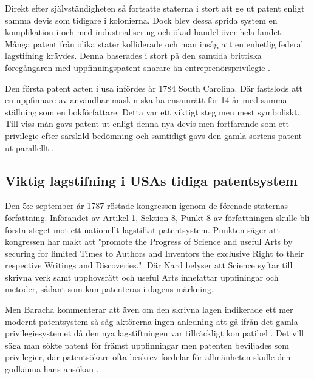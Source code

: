 Direkt efter självständigheten så fortsatte staterna i stort att ge ut patent enligt samma devis som tidigare i
kolonierna. Dock blev dessa sprida system en komplikation i och med industrialisering och ökad handel över
hela landet. Många patent från olika stater kolliderade och man insåg att en enhetlig federal
lagstifning krävdes. Denna baserades i stort på den samtida brittiska föregångaren med uppfinningspatent
snarare än entreprenörsprivilegie \cite{nard}.

Den första patent acten i usa infördes år 1784 South Carolina. Där fastslods att en uppfinnare av
användbar maskin ska ha ensamrätt för 14 år med samma ställning som en bokförfattare\cite{bracha}. Detta var ett viktigt steg men mest symboliskt. Till viss mån gavs patent ut enligt
denna nya devis men fortfarande som ett privilegie efter särskild bedömning och samtidigt gavs den gamla
sortens patent ut parallellt \cite{bracha}.



\subsection{Viktig lagstifning i USAs tidiga patentsystem}

Den 5:e september år 1787 röstade kongressen igenom de förenade staternas författning. Införandet av Artikel 1, Sektion 8, Punkt 8 av författningen skulle bli första steget mot ett nationellt lagstiftat patentsystem. Punkten säger att kongressen har
makt att "promote the Progress of Science and useful Arts by securing for limited Times to Authors and
Inventors the exclusive Right to their respective Writings and Discoveries.". Där Nard belyser att
Science syftar till skrivna verk samt upphovsrätt och useful Arts innefattar uppfiningar och metoder,
sådant som kan patenteras i dagens märkning\cite{nard}. 



Men Baracha kommenterar att även om den skrivna lagen indikerade ett mer modernt patentsystem så såg aktörerna ingen anledning att gå ifrån det gamla privilegiesystemet då den nya lagstiftningen var tillräckligt kompatibel \cite{bracha}. Det vill säga man sökte patent för främst uppfinningar men patenten beviljades som privilegier, där patentsökare ofta beskrev fördelar för allmänheten skulle den godkänna hans ansökan \cite{bracha}. %

